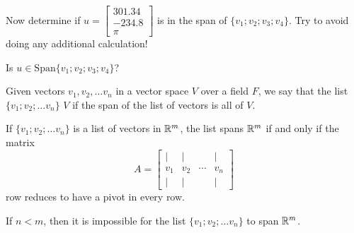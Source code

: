 

\edXsolution{ 
}


\endedxproblem


Now determine if  $u = \left[\begin{array}{c} 301.34 \\ -234.8 \\ \pi \end{array} \right]$
is in the span of $\{v_1; v_2; v_3; v_4 \}$.  Try to avoid doing any additional calculation!

Is $u \in \mathrm{Span}\{v_1; v_2; v_3; v_4 \}$?   



\edXsolution{ 
}


\endedxproblem


\endedxvertical








Given vectors $v_1, v_2, \ldots v_n$ in a vector space $V$ over a field $F$, we say that the list $\{v_1; v_2; \ldots v_n\}$ {} $V$ if 
the span of the list of vectors is all of $V$.



\endedxtext



If $\{v_1; v_2; \ldots v_n\}$ is a list of vectors in $\mathbb R^m$, the list spans $\mathbb R^m$ if and only if 
the matrix 
\[ A = \left[ \begin{array}{cccc} | & | & & | \\ 
v_1 & v_2 & \cdots & v_n \\
 | & | & & | \end{array} \right] \]
 row reduces to have a pivot in every row.  
 

If $n<m$, then it is impossible for the list $\{v_1; v_2; \ldots v_n\}$ to span $\mathbb R^m$.    


\endedxtext





